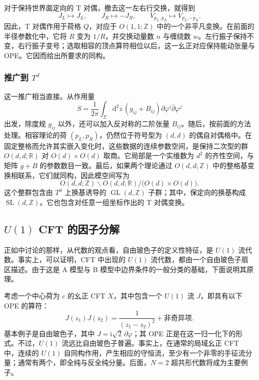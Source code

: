 对于保持世界面定向的 T 对偶，撤去这一左右行交换，就得到
\begin{equation}\label{eq:3.69}
J_L\longmapsto J_L,\qquad
J_R\longmapsto-J_R,\qquad
V_{p_L,p_R}\longmapsto V_{p_L,-p_R}.
\end{equation}
因此，T 对偶作用于荷格 $Q$，对应于 $O(1,1;\mathbb{Z})$ 中的一个非平凡变换。在前面的半径参数化中，它将 $R$ 变为 $1/R$，并交换动量数 $n$ 与缠绕数 $w$。左行振子保持不变，右行振子变号；选取相容的顶点算符相位以后，这一幺正对应保持能动张量与 OPE。它因而给出所要求的同构。

\subsubsection{推广到 \texorpdfstring{$T^d$}{Tᵈ}}\label{sec:3.2.3.8}

这一推广相当直接。从作用量
\[
S=\frac1{2\pi}\int_\Sigma\mathrm{d}^2z\,
(g_{ij}+B_{ij})\partial\varphi^i\bar\partial\varphi^j
\]
出发，除度规 $g_{ij}$ 以外，还可以加入反对称的二阶张量 $B_{ij}$。随后，按前面的方法处理。相容理论的荷 $(p_L,p_R)$，仍然位于符号型为 $(d,d)$ 的偶自对偶格中。在固定整格而允许其实嵌入变化时，这些数据的连续参数空间，是保持二次型的群 $O(d,d;\mathbb{R})$ 对 $O(d)\times O(d)$ 取商。它局部是一个实维数为 $d^2$ 的齐性空间，与矩阵 $g+B$ 的参数数目一致。最后，如果两个理论通过 $O(d,d;\mathbb{Z})$ 中的整格基变换相联系，它们就同构，因此模空间写为
\[
O(d,d;\mathbb{Z})\backslash O(d,d;\mathbb{R})
\big/\bigl(O(d)\times O(d)\bigr).
\]
这个整群包含由 $T^d$ 上换基诱导的 $\operatorname{GL}(d,\mathbb{Z})$ 子群；其中，保定向的换基构成 $\operatorname{SL}(d,\mathbb{Z})$。它也包含对任意一组坐标作出的 T 对偶变换。

\subsection{\texorpdfstring{$U(1)$}{U(1)} CFT 的因子分解}\label{sec:3.2.4}

正如中讨论的那样，从代数的观点看，自由玻色子的定义性特征，是 $U(1)$ 流代数。事实上，可以证明，CFT 中出现的 $U(1)$ 流代数，都由一个自由玻色子扇区描述。由于这是 A 模型与 B 模型中边界条件的一般分类的基础，下面说明其原理。

考虑一个中心荷为 $c$ 的幺正 CFT $X$，其中包含一个 $U(1)$ 流 $J$，即具有以下 OPE 的算符：
\[
J(z_1)J(z_2)=\frac1{(z_1-z_2)^2}+\text{非奇异项}.
\]
基本例子是自由玻色子，其中 $J=\mathrm{i}\sqrt2\,\partial\varphi$；其 OPE 正是在这一归一化下的形式。不过，$U(1)$ 流远比自由玻色子普遍。事实上，在通常的局域幺正 CFT 中，连续的 $U(1)$ 自同构作用，产生相应的守恒流，至少有一个非零的手征流分量；通常有两个，即全纯与反全纯分量。后面，$N=2$ 超共形代数将成为主要例子。

